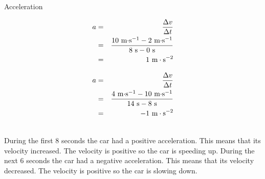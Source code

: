 \begin{wex}{Acceleration}
{
\begin{minipage}{0.5\textwidth}
\begin{eqnarray*}
a &=& \frac{\Delta v}{\Delta t}\\
&=& \frac{10\textrm{ m$\cdot$s$^{-1}$} - 2\textrm{ m$\cdot$s$^{-1}$}}{8\textrm{ s} - 0\textrm{ s}}\\
&=& 1~\text{m}\cdot \text{s}^{-2}
\end{eqnarray*}
\end{minipage}
\begin{minipage}{0.5\textwidth}
\begin{eqnarray*}
a &=& \frac{\Delta v}{\Delta t}\\
&=& \frac{4\textrm{ m$\cdot$s$^{-1}$} - 10\textrm{ m$\cdot$s$^{-1}$}}{14\textrm{ s} - 8\textrm{ s}}\\
&=& -1~\text{m}\cdot \text{s}^{-2}
\end{eqnarray*}
\end{minipage}\\
During the first 8 seconds the car had a positive acceleration. This means that its velocity increased. The velocity is positive so the car is speeding up.
During the next 6 seconds the car had a negative acceleration. This means that its velocity decreased. The velocity is positive so the car is slowing down.}
\end{wex}
    \noindent
\vspace{-2cm}
\label{m38794*secfhsst!!!underscore!!!id1815}
